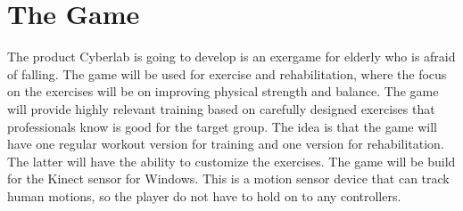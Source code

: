 \section{The Game}
The product Cyberlab is going to develop is an exergame for elderly who is afraid of falling. The game will be used for exercise and rehabilitation, where the focus on the exercises will be on improving physical strength and balance. The game will provide highly relevant training based on carefully designed exercises that professionals know is good for the target group. The idea is that the game will have one regular workout version for training and one version for rehabilitation. The latter will have the ability to customize the exercises. The game will be build for the Kinect sensor for Windows. This is a motion sensor device that can track human motions, so the player do not have to hold on to any controllers.

